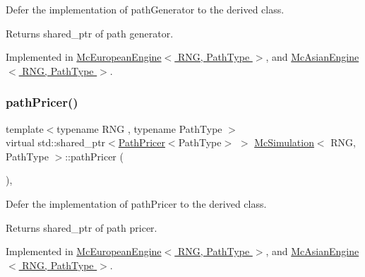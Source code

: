 Defer the implementation of path\+Generator to the derived class. 

\begin{DoxyReturn}{Returns}
shared\+\_\+ptr of path generator. 
\end{DoxyReturn}


Implemented in \hyperlink{class_mc_european_engine_a1e4fff8cadebec5aae259fc747dc12a3}{Mc\+European\+Engine$<$ R\+N\+G, Path\+Type $>$}, and \hyperlink{class_mc_asian_engine_ae38592c71ae4d5d09c9eb13d7cc0c5ff}{Mc\+Asian\+Engine$<$ R\+N\+G, Path\+Type $>$}.

\hypertarget{class_mc_simulation_a4d755ea777c2f3a2ec2fcc70acf71a6d}{}\label{class_mc_simulation_a4d755ea777c2f3a2ec2fcc70acf71a6d} 
\subsubsection{\texorpdfstring{path\+Pricer()}{pathPricer()}}
{\footnotesize\ttfamily template$<$typename R\+NG , typename Path\+Type $>$ \\
virtual std\+::shared\+\_\+ptr$<$\hyperlink{class_path_pricer}{Path\+Pricer}$<$Path\+Type$>$ $>$ \hyperlink{class_mc_simulation}{Mc\+Simulation}$<$ R\+NG, Path\+Type $>$\+::path\+Pricer (\begin{DoxyParamCaption}{ }\end{DoxyParamCaption})\hspace{0.3cm}{\ttfamily [private]}, {}}



Defer the implementation of path\+Pricer to the derived class. 

\begin{DoxyReturn}{Returns}
shared\+\_\+ptr of path pricer. 
\end{DoxyReturn}


Implemented in \hyperlink{class_mc_european_engine_ab07c50b4305c3e65f68ce3f0c9b740d6}{Mc\+European\+Engine$<$ R\+N\+G, Path\+Type $>$}, and \hyperlink{class_mc_asian_engine_a5b7351c28b68878b7f6d130eef293d6c}{Mc\+Asian\+Engine$<$ R\+N\+G, Path\+Type $>$}.

\hypertarget{class_mc_simulation_a61ed7348fc9fd05f05ede3c1ef83da16}{}\label{class_mc_simulation_a61ed7348fc9fd05f05ede3c1ef83da16} 
